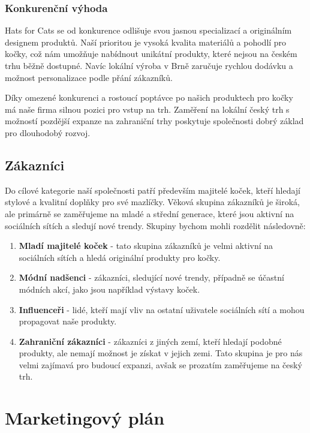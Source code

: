 \documentclass[12pt, a4paper]{article}
\begin{document}
\subsubsection{Konkurenční výhoda}
Hats for Cats se od konkurence odlišuje svou jasnou specializací a originálním designem produktů. Naší prioritou je vysoká kvalita materiálů a pohodlí pro kočky,
což nám umožňuje nabídnout unikátní produkty, které nejsou na českém trhu běžně dostupné.
Navíc lokální výroba v Brně zaručuje rychlou dodávku a možnost personalizace podle přání zákazníků.

\vspace{10pt}
\noindent Díky omezené konkurenci a rostoucí poptávce po našich produktech pro kočky má naše firma silnou pozici pro vstup na trh.
Zaměření na lokální český trh s možností pozdější expanze na zahraniční trhy poskytuje společnosti dobrý základ pro dlouhodobý rozvoj.

\subsection{Zákazníci}

Do cílové kategorie naší společnosti patří především majitelé koček, kteří hledají stylové a kvalitní doplňky pro své mazlíčky.
Věková skupina zákazníků je široká, ale primárně se zaměřujeme na mladé a střední generace, které jsou aktivní na sociálních sítích a sledují nové trendy.
Skupiny bychom mohli rozdělit následovně:

\begin{enumerate}
  \item \textbf{Mladí majitelé koček} - tato skupina zákazníků je velmi aktivní 
  na sociálních sítích a hledá originální produkty pro kočky.
  \item \textbf{Módní nadšenci} - zákazníci, sledující nové trendy,
  případně se účastní módních akcí, jako jsou například výstavy koček.
  \item \textbf{Influenceři} - lidé, kteří mají vliv na ostatní uživatele 
  sociálních sítí a mohou propagovat naše produkty.
  \item \textbf{Zahraniční zákazníci} - zákazníci z jiných zemí, kteří hledají
  podobné produkty, ale nemají možnost je získat v jejich zemi. Tato skupina je pro
  nás velmi zajímavá pro budoucí expanzi, avšak se prozatím zaměřujeme na český trh.
\end{enumerate}

\pagebreak

\section{Marketingový plán}
\end{document}
